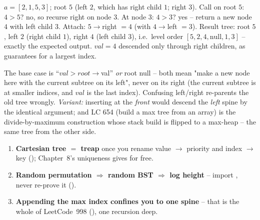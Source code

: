 \begin{tracebox}[Official sample 3: root \texttt{[5,2,3,null,1]}, \texttt{val = 4}]
$a=[2,1,5,3]$; root $5$ (left $2$, which has right child $1$; right $3$). Call on root $5$: $4>5$? no, so
recurse right on node $3$. At node $3$: $4>3$? yes -- return a new node $4$ with left child $3$. Attach:
$5\to$right $=4$ (with $4\to$left $=3$). Result tree: root $5$, left $2$ (right child $1$), right $4$ (left
child $3$), i.e.\ level order $[5,2,4,\text{null},1,3]$ -- exactly the expected output. $\mathit{val}=4$
descended only through right children, as  guarantees for a largest index. \checkmark
\end{tracebox}


\begin{warningbox}
The base case is ``$\mathit{val} > \mathit{root}\to$val'' \emph{or} root null -- both mean "make a new node
here with the current subtree on its left", never on its right (the current subtree is at smaller indices,
and $\mathit{val}$ is the last index). Confusing left/right re-parents the old tree wrongly. \emph{Variant:}
inserting at the \emph{front} would descend the \emph{left} spine by the identical argument; and LC 654
(build a max tree from an array) is the divide-by-maximum construction whose stack build is
 flipped to a max-heap -- the same tree from the other side.
\end{warningbox}

\begin{insightbox}
\begin{enumerate}[nosep, leftmargin=1.6em]
  \item \textbf{Cartesian tree $=$ treap} once you rename value $\to$ priority and index $\to$ key
        (); Chapter~8's uniqueness gives  for free.
  \item \textbf{Random permutation $\Rightarrow$ random BST $\Rightarrow$ log height} -- import
        , never re-prove it ().
  \item \textbf{Appending the max index confines you to one spine} -- that is the whole of LeetCode~998
        (), one recursion deep.
\end{enumerate}
\end{insightbox}

